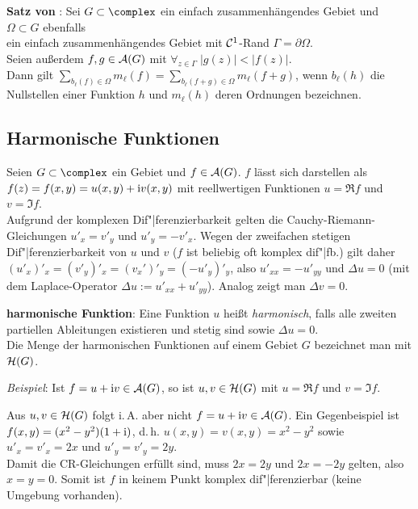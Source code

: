 \textbf{Satz von }:
Sei $G \subset \complex$ ein einfach zusammenhängendes Gebiet und
$\Omega \subset G$ ebenfalls\\
ein einfach zusammenhängendes Gebiet mit
$\mathcal{C}^1$-Rand $\Gamma = \partial \Omega$.\\
Seien außerdem $f, g \in \mathcal{A}(G)$ mit
$\forall_{z \in \Gamma}\; |g(z)| < |f(z)|$.\\
Dann gilt $\sum_{b_\ell(f) \in \Omega} m_\ell(f) =
\sum_{b_\ell(f + g) \in \Omega} m_\ell(f + g)$, wenn
$b_\ell(h)$ die Nullstellen einer Funktion $h$ und $m_\ell(h)$ deren Ordnungen
bezeichnen.

\subsection{%
    Harmonische Funktionen%
}

Seien $G \subset \complex$ ein Gebiet und $f \in \mathcal{A}(G)$.
$f$ lässt sich darstellen als\\
$f(z) = f(x, y) = u(x, y) + \mathrm{i} v(x, y)$ mit
reellwertigen Funktionen $u = \Re f$ und $v = \Im f$.\\
Aufgrund der komplexen Dif"|ferenzierbarkeit gelten die
Cauchy-Riemann-Gleichungen $u'_x = v'_y$ und $u'_y = -v'_x$.
Wegen der zweifachen stetigen Dif"|ferenzierbarkeit von $u$ und $v$
($f$ ist beliebig oft komplex dif"|fb.) gilt daher
$(u'_x)'_x = (v'_y)'_x = (v_x')'_y = (-u'_y)'_y$, also
$u'_{xx} = -u'_{yy}$ und $\Delta u = 0$
(mit dem Laplace-Operator $\Delta u := u'_{xx} + u'_{yy}$).
Analog zeigt man $\Delta v = 0$.

\textbf{harmonische Funktion}:
Eine Funktion $u$ heißt \emph{harmonisch},
falls alle zweiten partiellen Ableitungen
existieren und stetig sind sowie $\Delta u = 0$.\\
Die Menge der harmonischen Funktionen auf einem Gebiet $G$ bezeichnet man
mit $\mathcal{H}(G)$.

\emph{Beispiel}:
Ist $f = u + \mathrm{i} v \in \mathcal{A}(G)$, so ist $u, v \in \mathcal{H}(G)$ mit $u = \Re f$ und
$v = \Im f$.

Aus $u, v \in \mathcal{H}(G)$ folgt i.\,A. aber nicht $f = u + \mathrm{i} v \in \mathcal{A}(G)$.
Ein Gegenbeispiel ist\\
$f(x, y) = (x^2 - y^2) (1 + \mathrm{i})$, d.\,h.
$u(x, y) = v(x, y) = x^2 - y^2$ sowie
$u'_x = v'_x = 2x$ und $u'_y = v'_y = 2y$.\\
Damit die CR-Gleichungen erfüllt sind, muss $2x = 2y$ und
$2x = -2y$ gelten, also $x = y = 0$.
Somit ist $f$ in keinem Punkt komplex dif"|ferenzierbar
(keine Umgebung vorhanden).

